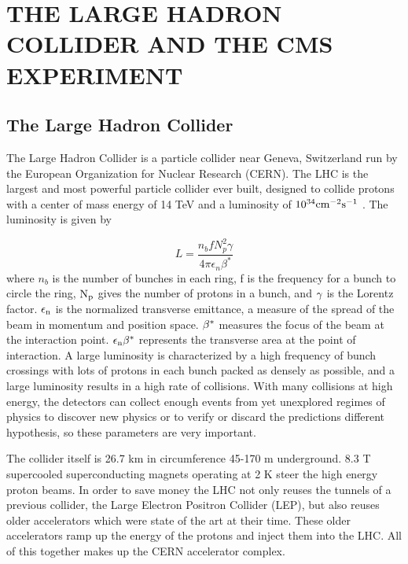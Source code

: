 \chapter{THE LARGE HADRON COLLIDER AND THE CMS EXPERIMENT} \label{lhc-cms}

\section{The Large Hadron Collider}
The Large Hadron Collider is a particle collider near Geneva, Switzerland run by the European Organization for Nuclear Research (CERN). The LHC is the largest and most powerful particle collider ever built, designed to collide protons with a center of mass energy of 14 TeV and a luminosity of $10^{34} {\rm cm^{-2}s^{-1}}$ \cite{LHC}. The luminosity is given by

\begin{equation}
L = \frac{n_{b} f N^{2}_{p} \gamma}{4\pi\epsilon_{n}\beta^{*}}
\end{equation}
where $n_{b}$ is the number of bunches in each ring, f is the frequency for a bunch to circle the ring, ${\rm N_{p}}$ gives the number of protons in a bunch, and ${\rm \gamma}$ is the Lorentz factor. ${\rm \epsilon_{n}}$ is the normalized transverse emittance, a measure of the spread of the beam in momentum and position space. ${\rm \beta^{*}}$ measures the focus of the beam at the interaction point. ${\rm \epsilon_{n}\beta^{*}}$ represents the transverse area at the point of interaction. A large luminosity is characterized by a high frequency of bunch crossings with lots of protons in each bunch packed as densely as possible, and a large luminosity results in a high rate of collisions. With many collisions at high energy, the detectors can collect enough events from yet unexplored regimes of physics to discover new physics or to verify or discard the predictions different hypothesis, so these parameters are very important. 

The collider itself is 26.7 km in circumference 45-170 m underground. 8.3 T supercooled superconducting magnets operating at 2 K steer the high energy proton beams. In order to save money the LHC not only reuses the tunnels of a previous collider, the Large Electron Positron Collider (LEP), but also reuses older accelerators which were state of the art at their time. These older accelerators ramp up the energy of the protons and inject them into the LHC. All of this together makes up the CERN accelerator complex.

